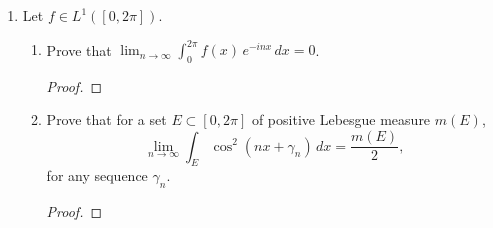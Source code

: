 \documentclass[12pt]{article}
\begin{document}
\begin{enumerate}
	      \begin{enumerate}[label=(\roman*)]
		      \item Show that $f \in L^1([0,1])$.

		            \begin{proof}
		            \end{proof}

		      \item Show that $f$ is unbounded on every open set (and remains so after modification on a set of measure zero). Show that $f$ is discontinuous at every point in $[0,1]$ and remains so after modification on a set of measure zero.

		            \begin{proof}
		            \end{proof}

		      \item Let $0 < \varepsilon < 1$. Construct a compact subset $K_\varepsilon$ of $[0,1]$ such that $m(K_\varepsilon) \geq 1 - \varepsilon$ and $f\mathbf{1}_{K_\varepsilon}$ is continuous on $K_\varepsilon$.

		            \begin{proof}
		            \end{proof}
	      \end{enumerate}

	\item Let $f \in L^1([0, 2\pi])$.

	      \begin{enumerate}[label=(\roman*)]
		      \item Prove that $\displaystyle\lim_{n\to\infty} \int_0^{2\pi} f(x)\,e^{-inx}\,dx = 0$.

		            \begin{proof}
		            \end{proof}

		      \item Prove that for a set $E \subset [0, 2\pi]$ of positive Lebesgue measure $m(E)$,
		            \[
			            \lim_{n\to\infty} \int_E \cos^2(nx + \gamma_n)\,dx = \frac{m(E)}{2},
		            \]
		            for any sequence $\gamma_n$.

		            \begin{proof}
		            \end{proof}


\end{enumerate}
\end{enumerate}
\end{document}
